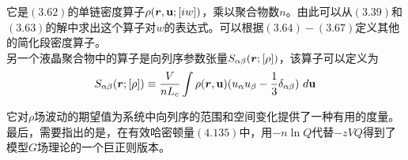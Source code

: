 它是$(3.62)$的单链密度算子$\rho(\bm{r},\mathbf{u};[i w])$，乘以聚合物数$n$。由此可以从$(3.39)$和$(3.63)$的解中求出这个算子对$w$的表达式。可以根据$(3.64)-(3.67)$定义其他的简化段密度算子。\\

另一个液晶聚合物中的算子是向列序参数张量$S_{\alpha \beta}(\bm{r};[\rho])$，该算子可以定义为\\
\begin{equation}
S_{\alpha \beta}(\bm{r};[\rho]) \equiv \frac{V}{n L_{c}} \int \rho(\bm{r},\mathbf{u})(u_{\alpha} u_{\beta}-\frac{1}{3} \delta_{\alpha \beta})~d\mathbf{u}
\end{equation}

它对$\rho$场波动的期望值为系统中向列序的范围和空间变化提供了一种有用的度量。最后，需要指出的是，在有效哈密顿量$(4.135)$中，用$-n \ln Q$代替$-z VQ$得到了模型$G$场理论的一个巨正则版本。\\
